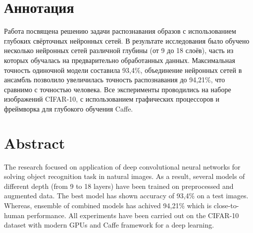 \section*{Аннотация}
Работа посвящена решению задачи распознавания образов с использованием глубоких свёрточных 
нейронных сетей. В результате исследования было обучено несколько нейронных сетей различной глубины 
(от 9 до 18 слоёв), часть из которых обучалась на предварительно обработанных данных. Максимальная 
точность одиночной модели составила 93,4\%, объединение нейронных сетей в ансамбль позволило
увеличилась точность распознавания до 94,21\%, что сравнимо с точностью человека. Все эксперименты 
проводились на наборе изображений CIFAR-10, с использованием графических процессоров и фреймворка
для глубокого обучения Caffe.

\section*{Abstract}
The research focused on application of deep convolutional neural networks for
solving object recognition task in natural images. As a result, several models of different depth
(from 9 to 18 layers) have been trained on preprocessed and augmented data. The best model has shown accuracy 
of 93,4\% on a test images. Whereas, ensemble of combined models has achived 94,21\% which is 
close-to-human performance. All experiments have been carried out on the CIFAR-10 dataset with modern GPUs
and Caffe framework for a deep learning.